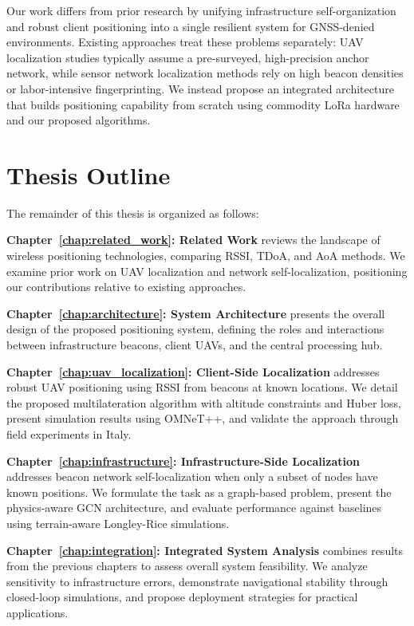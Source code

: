 \documentclass[master,final,11pt]{iscs-thesis}
\begin{document}
Our work differs from prior research by unifying infrastructure self-organization and robust client positioning into a single resilient system for GNSS-denied environments.
Existing approaches treat these problems separately: UAV localization studies typically assume a pre-surveyed, high-precision anchor network, while sensor network localization methods rely on high beacon densities or labor-intensive fingerprinting.
We instead propose an integrated architecture that builds positioning capability from scratch using commodity LoRa hardware and our proposed algorithms.

\section{Thesis Outline}
\label{sec:outline}

The remainder of this thesis is organized as follows:

\textbf{Chapter~\ref{chap:related_work}: Related Work} reviews the landscape of wireless positioning technologies, comparing RSSI, TDoA, and AoA methods.
We examine prior work on UAV localization and network self-localization, positioning our contributions relative to existing approaches.

\textbf{Chapter~\ref{chap:architecture}: System Architecture} presents the overall design of the proposed positioning system, defining the roles and interactions between infrastructure beacons, client UAVs, and the central processing hub.

\textbf{Chapter~\ref{chap:uav_localization}: Client-Side Localization} addresses robust UAV positioning using RSSI from beacons at known locations.
We detail the proposed multilateration algorithm with altitude constraints and Huber loss, present simulation results using OMNeT++, and validate the approach through field experiments in Italy.

\textbf{Chapter~\ref{chap:infrastructure}: Infrastructure-Side Localization} addresses beacon network self-localization when only a subset of nodes have known positions.
We formulate the task as a graph-based problem, present the physics-aware GCN architecture, and evaluate performance against baselines using terrain-aware Longley-Rice simulations.

\textbf{Chapter~\ref{chap:integration}: Integrated System Analysis} combines results from the previous chapters to assess overall system feasibility.
We analyze sensitivity to infrastructure errors, demonstrate navigational stability through closed-loop simulations, and propose deployment strategies for practical applications.
\end{document}
